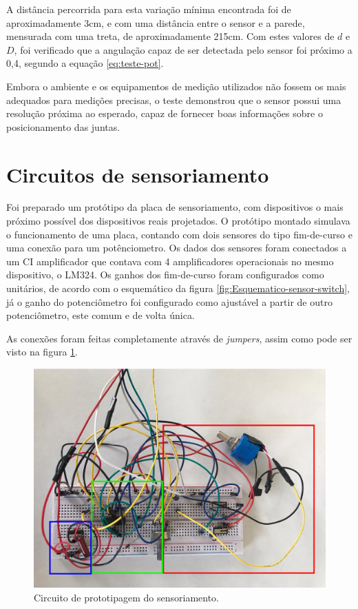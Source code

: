 A distância percorrida para esta variação mínima encontrada foi de aproximadamente
3cm, e com uma distância entre o sensor e a parede, mensurada com uma treta,
de aproximadamente 215cm. Com estes valores de $d$ e $D$, foi verificado que a angulação 
capaz de ser detectada pelo sensor foi próximo a 0,4\textdegree, segundo a 
equação \ref{eq:teste-pot}.

Embora o ambiente e os equipamentos de medição utilizados não fossem os mais adequados
para medições precisas, o teste demonstrou que o sensor possui uma resolução próxima 
ao esperado, capaz de fornecer boas informações sobre o posicionamento das juntas.

\section{Circuitos de sensoriamento}

Foi preparado um protótipo da placa de sensoriamento, com dispositivos o mais próximo possível 
dos dispositivos reais projetados. O protótipo montado simulava o funcionamento de uma 
placa, contando com dois sensores do tipo fim-de-curso e uma conexão para um potênciometro.
Os dados dos sensores foram conectados a um CI amplificador que contava com 4 amplificadores
operacionais no mesmo dispositivo, o LM324. Os ganhos dos fim-de-curso foram configurados como 
unitários, de acordo com o esquemático da figura \ref{fig:Esquematico-sensor-switch}, já o ganho
do potenciômetro foi configurado como ajustável a partir de outro potenciômetro, este comum e de
volta única.

As conexões foram feitas completamente através de \textit{jumpers}, assim como pode ser visto na
figura \ref{fig:proto-sensor}.

\begin{figure}[h]
    \caption{Circuito de prototipagem do sensoriamento.}

    \begin{centering}
        \includegraphics[width=0.75\columnwidth]{images/resultados/proto-sensor.jpeg} 
    \par\end{centering}

    \label{fig:proto-sensor}
\end{figure}

